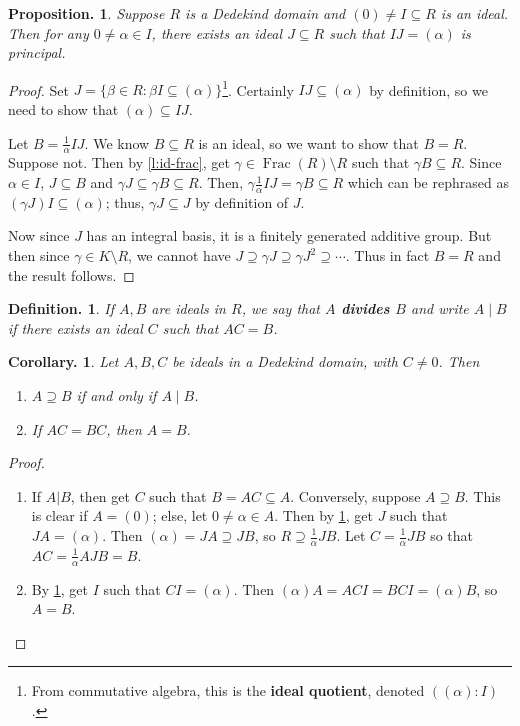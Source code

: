 \documentclass[11pt, a4paper]{memoir}
\theoremstyle{change}
\newtheorem{corollary}[theorem]{Corollary.}
\newtheorem{proposition}[theorem]{Proposition.}
\theoremstyle{plain}
\theoremstyle{nonumberplain}
\newtheorem{definition}{Definition.}
\newtheorem{proof}{Proof}
\DeclareMathOperator{\Frac}{Frac}
\newcommand{\mbf}[1]{{\boldmath\bfseries #1}}
\numberwithin{equation}{section}
\begin{document}
\begin{proposition}\label{p:id-inv}
    Suppose $R$ is a Dedekind domain and $(0)\neq I\subseteq R$ is an ideal.
    Then for any $0\neq \alpha\in I$, there exists an ideal $J\subseteq R$ such that $IJ=(\alpha)$ is principal.
\end{proposition}
\begin{proof}
    Set $J=\{\beta\in R:\beta I\subseteq(\alpha)\}$\footnote{From commutative algebra, this is the \textbf{ideal quotient}, denoted $((\alpha):I)$.}.
    Certainly $IJ\subseteq(\alpha)$ by definition, so we need to show that $(\alpha)\subseteq IJ$.

    Let $B=\frac{1}{\alpha}IJ$.
    We know $B\subseteq R$ is an ideal, so we want to show that $B=R$.
    Suppose not.
    Then by \cref{l:id-frac}, get $\gamma\in \Frac(R)\setminus R$ such that $\gamma B\subseteq R$.
    Since $\alpha\in I$, $J\subseteq B$ and $\gamma J\subseteq\gamma B\subseteq R$.
    Then, $\gamma\frac{1}{\alpha} IJ=\gamma B\subseteq R$ which can be rephrased as $(\gamma J)I\subseteq(\alpha)$; thus, $\gamma J\subseteq J$ by definition of $J$.

    Now since $J$ has an integral basis, it is a finitely generated additive group.
    But then since $\gamma\in K\setminus R$, we cannot have $J\supseteq\gamma J\supseteq\gamma J^2\supseteq\cdots$.
    Thus in fact $B=R$ and the result follows.
\end{proof}
\begin{definition}
    If $A,B$ are ideals in $R$, we say that \mbf{$A$ divides $B$} and write $A\mid B$ if there exists an ideal $C$ such that $AC=B$.
\end{definition}
\begin{corollary}\label{cor:id-div}
    Let $A,B,C$ be ideals in a Dedekind domain, with $C\neq 0$.
    Then
    \begin{enumerate}[nolistsep,label=(\roman*)]
        \item $A\supseteq B$ if and only if $A\mid B$.
        \item If $AC=BC$, then $A=B$.
    \end{enumerate}
\end{corollary}
\begin{proof}
    \begin{enumerate}[label=(\roman*)]
        \item If $A|B$, then get $C$ such that $B=AC\subseteq A$.
            Conversely, suppose $A\supseteq B$.
            This is clear if $A=(0)$; else, let $0\neq\alpha\in A$.
            Then by \cref{p:id-inv}, get $J$ such that $JA=(\alpha)$.
            Then $(\alpha)=JA\supseteq JB$, so $R\supseteq\frac{1}{\alpha}JB$.
            Let $C=\frac{1}{\alpha}JB$ so that $AC=\frac{1}{\alpha}AJB=B$.
        \item By \cref{p:id-inv}, get $I$ such that $CI=(\alpha)$.
            Then $(\alpha)A=ACI=BCI=(\alpha)B$, so $A=B$.
    \end{enumerate}
\end{proof}
\end{document}
